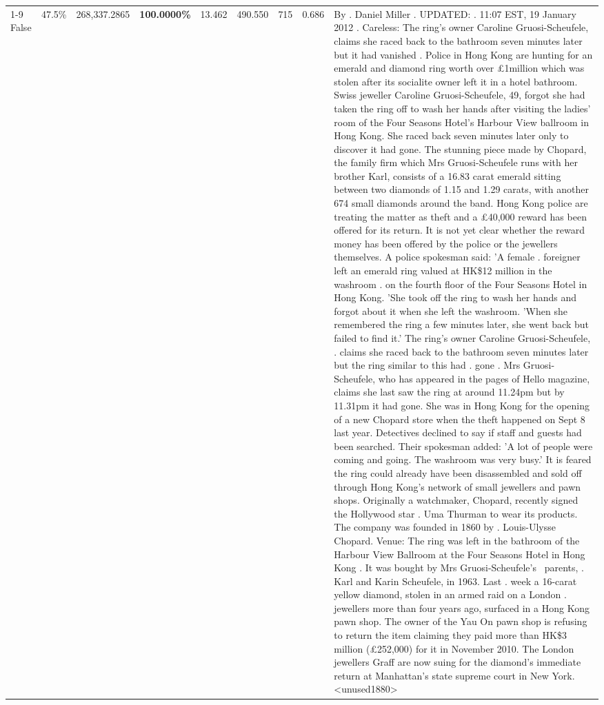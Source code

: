\begin{table}[H]
\begin{tabular}{lllrlllll}
\cline{1-9}
False & 47.5\% & \color{red} 268,337.2865 & \bfseries \color{red} 100.0000\% & 13.462 & 490.550 & 715 & 0.686 & By . Daniel Miller . UPDATED: . 11:07 EST, 19 January 2012 . Careless: The ring's owner Caroline Gruosi-Scheufele, claims she raced back to the bathroom seven minutes later but it had vanished . Police in Hong Kong are hunting for an emerald and diamond ring worth over £1million which was stolen after its socialite owner left it in a hotel bathroom. Swiss jeweller Caroline Gruosi-Scheufele, 49, forgot she had taken the ring off to wash her hands after visiting the ladies' room of the Four Seasons Hotel's Harbour View ballroom in Hong Kong. She raced back seven minutes later only to discover it had gone. The stunning piece made by Chopard, the family firm which Mrs Gruosi-Scheufele runs with her brother Karl, consists of a 16.83 carat emerald sitting between two diamonds of 1.15 and 1.29 carats, with another 674 small diamonds around the band. Hong Kong police are treating the matter as theft and a £40,000 reward has been offered for its return. It is not yet clear whether the reward money has been offered by the police or the jewellers themselves. A police spokesman said: 'A female . foreigner left an emerald ring valued at HK\$12 million in the washroom . on the fourth floor of the Four Seasons Hotel in Hong Kong. 'She took off the ring to wash her hands and forgot about it when she left the washroom. 'When she remembered the ring a few minutes later, she went back but failed to find it.' The ring's owner Caroline Gruosi-Scheufele, . claims she raced back to the bathroom seven minutes later but the ring similar to this had . gone . Mrs Gruosi-Scheufele, who has appeared in the pages of Hello magazine, claims she last saw the ring at around 11.24pm but by 11.31pm it had gone. She was in Hong Kong for the opening of a new Chopard store when the theft happened on Sept 8 last year. Detectives declined to say if staff and guests had been searched. Their spokesman added: 'A lot of people were coming and going. The washroom was very busy.' It is feared the ring could already have been disassembled and sold off through Hong Kong's network of small jewellers and pawn shops. Originally a watchmaker, Chopard, recently signed the Hollywood star . Uma Thurman to wear its products. The company was founded in 1860 by . Louis-Ulysse Chopard. Venue: The ring was left in the bathroom of the Harbour View Ballroom at the Four Seasons Hotel in Hong Kong . It was bought by Mrs Gruosi-Scheufele's  parents, . Karl and Karin Scheufele, in 1963. Last . week a 16-carat yellow diamond, stolen in an armed raid on a London . jewellers more than four years ago, surfaced in a Hong Kong pawn shop. The owner of the Yau On pawn shop is refusing to return the item claiming they paid more than HK\$3 million (£252,000) for it in November 2010. The London jewellers Graff are now suing for the diamond’s immediate return at Manhattan’s state supreme court in New York.<unused1880> \\

\end{tabular}
\end{table}
